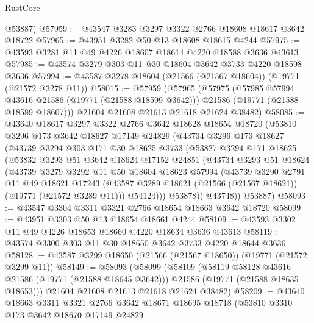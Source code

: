 \begin{lexlean}{RustCore}
\begin{coremodule}
      @53887)
@57959 := @43547 @3283 @3297 @3322 @2766 @18608 @18617 @3642 @18722
@57965 := @43951 @3282 @50 @13 @18608 @18615 @4244
@57975 := @43593 @3281 @11 @49 @4226 @18607 @18614 @4220 @18588 @3636 @43613
@57985 := @43574 @3279 @303 @11 @30 @18604 @3642 @3733 @4220 @18598 @3636
@57994 := @43587 @3278 @18604 (@21566 (@21567 @18604)) (@19771 (@21572 @3278 @11))
@58015 := @57959
    (@57965
      (@57975
        (@57985 @57994 @43616 @21586 (@19771 (@21588 @18599 @3642)))
        @21586
        (@19771 (@21588 @18589 @18607)))
      @21604
      @21608
      @21613
      @21618
      @21624
      @38482)
@58085 := @43640
    @18617
    @3297
    @3322
    @2766
    @3642
    @18628
    @18654
    @18720
    (@53810
      @3296
      @173
      @3642
      @18627
      @17149
      @24829
      (@43734
        @3296
        @173
        @18627
        (@43739
          @3294
          @303
          @171
          @30
          @18625
          @3733
          (@53827
            @3294
            @171
            @18625
            (@53832
              @3293
              @51
              @3642
              @18624
              @17152
              @24851
              (@43734
                @3293
                @51
                @18624
                (@43739
                  @3279
                  @3292
                  @11
                  @50
                  @18604
                  @18623
                  @57994
                  (@43739
                    @3290
                    @2791
                    @11
                    @49
                    @18621
                    @17243
                    (@43587 @3289 @18621 (@21566 (@21567 @18621)) (@19771 (@21572 @3289 @11)))
                    @54124)))
              @53878))
          @43748))
      @53887)
@58093 := @43547 @3304 @3311 @3321 @2766 @18654 @18663 @3642 @18720
@58099 := @43951 @3303 @50 @13 @18654 @18661 @4244
@58109 := @43593 @3302 @11 @49 @4226 @18653 @18660 @4220 @18634 @3636 @43613
@58119 := @43574 @3300 @303 @11 @30 @18650 @3642 @3733 @4220 @18644 @3636
@58128 := @43587 @3299 @18650 (@21566 (@21567 @18650)) (@19771 (@21572 @3299 @11))
@58149 := @58093
    (@58099
      (@58109
        (@58119 @58128 @43616 @21586 (@19771 (@21588 @18645 @3642)))
        @21586
        (@19771 (@21588 @18635 @18653)))
      @21604
      @21608
      @21613
      @21618
      @21624
      @38482)
@58209 := @43640
    @18663
    @3311
    @3321
    @2766
    @3642
    @18671
    @18695
    @18718
    (@53810
      @3310
      @173
      @3642
      @18670
      @17149
      @24829

\end{coremodule}
\end{lexlean}
